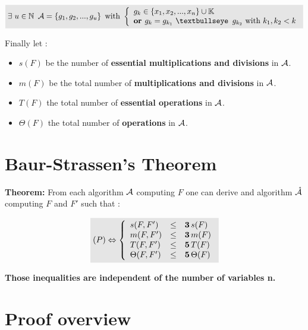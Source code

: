 $$
\begin{equation}
\colbox{
\label{algo}
\exists\,\, u \in \mathbb{N} \,\,\, \A = \left\{ g_1,g_2,...,g_u \right\}
\textrm{ with }
   \left \{
   \begin{array}{l}
       g_k \in \left\{x_1,x_2,...,x_n\right\} \cup \mathbb{K}\\
       \textrm{\textbf{or }} g_k = g_{k_1} \textrm{ \textbullseye\, } g_{k_2}\textrm{ with }k_1,k_2 < k
   \end{array}
   \right .
}
\end{equation}
$$

Finally let :

\begin{itemize}
\item $s(F)$ be the number of \textbf{essential multiplications and divisions} in $\mathcal{A}$.
    \item $m(F)$ be the total number of \textbf{multiplications and divisions} in $\mathcal{A}$.
    \item $T(F)$ the total number of \textbf{essential operations} in $\mathcal{A}$.
    \item $\Theta(F)$ the total number of \textbf{operations} in $\mathcal{A}$.
\end{itemize}

\section{Baur-Strassen's Theorem}
\textbf{Theorem:} From each algorithm $\mathcal{A}$ computing $F$ one can derive and algorithm $\mathring{\mathcal{A}}$ computing $F$ and $F'$ such that :


$$
\begin{equation}
    \label{SB}
    \colbox{
    (P) \Leftrightarrow
   \left \{
   \begin{array}{l c l}
       s(F,F') &\leq & \mathbf{3} \,s(F)\\
       m(F,F') &\leq & \mathbf{3} \,m(F)\\
       T(F,F') &\leq & \mathbf{5} \,T(F)\\
       \Theta(F,F') &\leq & \mathbf{5} \,\Theta(F)
   \end{array}
   \right .
}
\end{equation}
$$

\vskip 0.5cm
\textbf{Those inequalities are independent of the number of variables n.}

\section{Proof overview}

